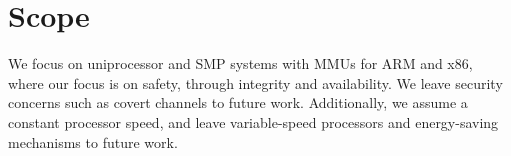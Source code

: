 \section{Scope}

We focus on uniprocessor and \gls{SMP} systems with \glspl{MMU} for ARM and x86, where our focus is
on safety, through integrity and availability. We leave security concerns such as covert channels to
future work. Additionally, we assume a constant processor speed, and leave variable-speed processors
and energy-saving mechanisms to future work.
